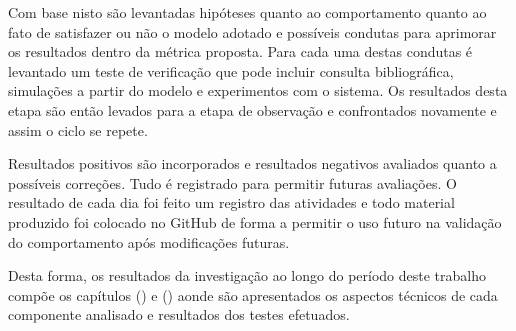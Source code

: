 Com base nisto são levantadas hipóteses quanto ao comportamento quanto ao fato de satisfazer ou não o modelo adotado e possíveis condutas para aprimorar os resultados dentro da métrica proposta. Para cada uma destas condutas é levantado um teste de verificação que pode incluir consulta bibliográfica, simulações a partir do modelo e experimentos com o sistema. Os resultados desta etapa são então levados para a etapa de observação e confrontados novamente e assim o ciclo se repete.

Resultados positivos são incorporados e resultados negativos avaliados quanto a possíveis correções. Tudo é registrado para permitir futuras avaliações. O resultado de cada dia foi feito um registro das atividades e todo material produzido foi colocado no GitHub de forma a permitir o uso futuro na validação do comportamento após modificações futuras.

Desta forma, os resultados da investigação ao longo do período deste trabalho compõe os capítulos () e () aonde são apresentados os aspectos técnicos de cada componente analisado e resultados dos testes efetuados. 

